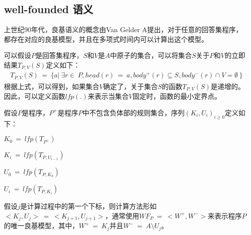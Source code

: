 \subsection{well-founded 语义}
上世纪90年代，良基语义的概念由Van Gelder A提出，对于任意的回答集程序，都存在对应的良基模型，并且在多项式时间内\cite{van1991well}可以计算出这个模型。
\begin{definition}可以假设$P$是回答集程序，$S$和$V$是$A$中原子的集合，可以将集合$S$关于$P$和$V$的立即结果$T_{P,V}(S)$定义如下：
    \begin{align}
        \label{rule:6}
        T_{P,V}(S) \ = \ \{a| \ \exists r \in \ P,head(r) \ = \ a,body^+(r) \subseteq S, body^-(r) \cap V = \emptyset \ \}
    \end{align}
    根据上式，可以得到，如果集合$V$确定了，关于集合$S$的函数$T_{P,V}(S)$是递增的。因此，可以定义函数$lfp(.)$来表示当集合$V$固定时，函数的最小定界点。
\end{definition}
\begin{definition}假设$P$是程序，$P^+$是程序$P$中不包含负体部的规则集合，序列$(K_i,U_i)_{i \geqslant 0}$定义如下：

$K_0 \ = \ lfp(T_{P^+})$

$K_i \ = \ lfp(T_{P,U_{i-1}})$

$U_0 \ = \ lfp(T_{P,K_0})$

$U_i \ = \ lfp(T_{P,K_i})$

假设$j$是计算过程中的第一个下标，则计算方法形如$<K_j,U_j> \ = \ <K_{j+1},U_{j+1}>$，通常使用$WF_P \ = \ <W^+,W^->$来表示程序$P$的唯一良基模型，其中，$W^+ \ = \ K_j$并且$W^- \ = \ A\setminus U_j$。
\end{definition}
